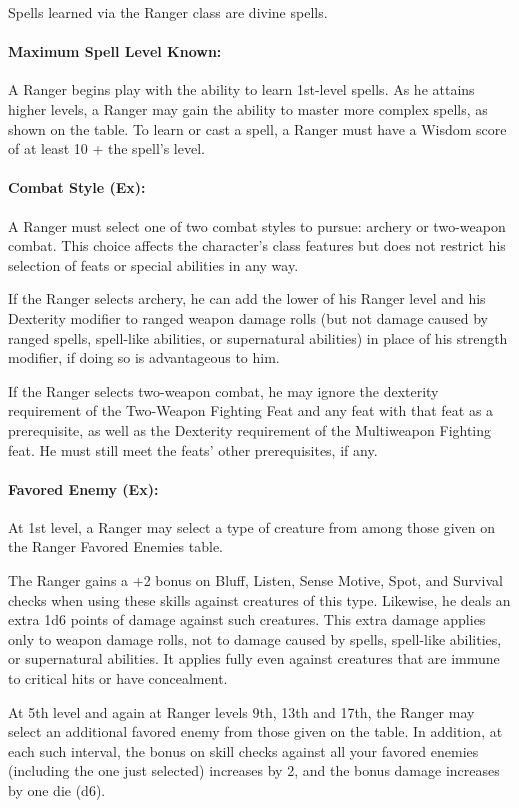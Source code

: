 Spells learned via the Ranger class are divine spells.
\paragraph{Maximum Spell Level Known:} A Ranger begins play with the ability to learn 1st-level spells. 
As he attains higher levels, a Ranger may gain the ability to master more complex spells, as shown on the  table.
To learn or cast a spell, a Ranger must have a Wisdom score of at least 10 + the spell's level.

\paragraph{Combat Style (Ex):}
A Ranger must select one of two combat styles to pursue: archery or two-weapon combat. This choice affects the character's class features but does not restrict his selection of feats or special abilities in any way.

If the Ranger selects archery, he can add the lower of his Ranger level and his Dexterity modifier to ranged weapon damage rolls (but not damage caused by ranged spells, spell-like abilities, or supernatural abilities) in place of his strength modifier, if doing so is advantageous to him. 

If the Ranger selects two-weapon combat, he may ignore the dexterity requirement of the Two-Weapon Fighting Feat and any feat with that feat as a prerequisite, as well as the Dexterity requirement of the Multiweapon Fighting feat. He must still meet the feats' other prerequisites, if any.
\paragraph{Favored Enemy (Ex):}
At 1st level, a Ranger may select a type of creature from among those given on the Ranger Favored Enemies table. %

The Ranger gains a +2 bonus on Bluff, Listen, Sense Motive, Spot, and Survival checks when using these skills against creatures of this type. 
Likewise, he deals an extra 1d6 points of damage against such creatures. 
This extra damage applies only to weapon damage rolls, not to damage caused by spells, spell-like abilities, or supernatural abilities.
It applies fully even against creatures that are immune to critical hits or have concealment.

At 5th level and again at Ranger levels 9th, 13th and 17th, the Ranger may select an additional favored enemy from those given on the table. 
In addition, at each such interval, the bonus on skill checks against all your favored enemies (including the one just selected) increases by 2, and the bonus damage increases by one die (d6).

